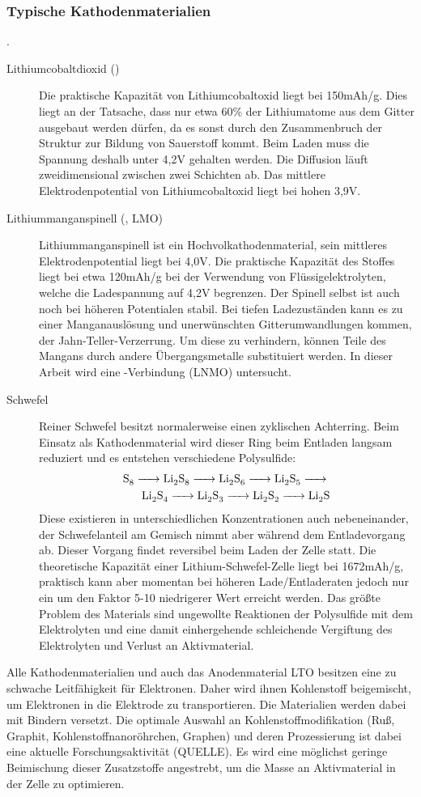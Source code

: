 \documentclass[a4paper, 11pt, headsepline,footsepline,twoside,abstract]{scrbook}
\begin{document}
\subsubsection{Typische Kathodenmaterialien}
. %
\begin{description}
\item[Lithiumcobaltdioxid ()] Die praktische Kapazität von Lithiumcobaltoxid liegt bei 150mAh/g. Dies liegt an der Tatsache, dass nur etwa 60\% der Lithiumatome aus dem Gitter ausgebaut werden dürfen, da es sonst durch den Zusammenbruch der Struktur zur Bildung von Sauerstoff kommt. Beim Laden muss die Spannung deshalb unter 4,2V gehalten werden. Die Diffusion läuft zweidimensional zwischen zwei Schichten ab. Das mittlere Elektrodenpotential von Lithiumcobaltoxid liegt bei hohen 3,9V.
\item[Lithiummanganspinell (, LMO)] Lithiummanganspinell ist ein Hochvolkathodenmaterial, sein mittleres Elektrodenpotential liegt bei 4,0V. Die praktische Kapazität des Stoffes liegt bei etwa 120mAh/g bei der Verwendung von Flüssigelektrolyten, welche die Ladespannung auf 4,2V begrenzen. Der Spinell selbst ist auch noch bei höheren Potentialen stabil. Bei tiefen Ladezuständen kann es zu einer Manganauslösung und unerwünschten Gitterumwandlungen kommen, der Jahn-Teller-Verzerrung. Um diese zu verhindern, können Teile des Mangans durch andere Übergangsmetalle substituiert werden. In dieser Arbeit wird eine -Verbindung (LNMO) untersucht.
\item[Schwefel] Reiner Schwefel besitzt normalerweise einen zyklischen Achterring. Beim Einsatz als Kathodenmaterial wird dieser Ring beim Entladen langsam reduziert und es entstehen verschiedene Polysulfide:
\begin{equation}
\begin{split}
\ce{S8 -> Li2S8 -> Li2S6 -> Li2S5 -> }\\
\ce{ Li2S4 -> Li2S3 -> Li2S2 -> Li2S}
\end{split}
\end{equation}
Diese existieren in unterschiedlichen Konzentrationen auch nebeneinander, der Schwefelanteil am Gemisch nimmt aber während dem Entladevorgang ab. Dieser Vorgang findet reversibel beim Laden der Zelle statt. Die theoretische Kapazität einer Lithium-Schwefel-Zelle liegt bei 1672mAh/g, praktisch kann aber momentan bei höheren Lade/Entladeraten jedoch nur ein um den Faktor 5-10 niedrigerer Wert erreicht werden. Das größte Problem des Materials sind ungewollte Reaktionen der Polysulfide mit dem Elektrolyten und eine damit einhergehende schleichende Vergiftung des Elektrolyten und Verlust an Aktivmaterial.
\end{description}
Alle Kathodenmaterialien und auch das Anodenmaterial LTO besitzen eine zu schwache Leitfähigkeit für Elektronen. Daher wird ihnen Kohlenstoff beigemischt, um Elektronen in die Elektrode zu transportieren. Die Materialien werden dabei mit Bindern versetzt. Die optimale Auswahl an Kohlenstoffmodifikation (Ruß, Graphit, Kohlenstoffnanoröhrchen, Graphen) und deren Prozessierung ist dabei eine aktuelle Forschungsaktivität (QUELLE). Es wird eine möglichst geringe Beimischung dieser Zusatzstoffe angestrebt, um die Masse an Aktivmaterial in der Zelle zu optimieren.
\end{document}
